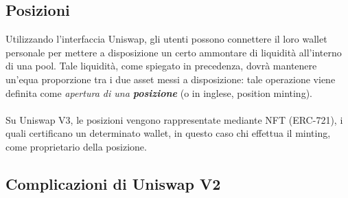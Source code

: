 \documentclass[12pt,a4paper]{report}
\begin{document}
\subsection{Posizioni}

Utilizzando l'interfaccia Uniswap, gli utenti possono connettere il loro wallet personale per mettere a disposizione un certo ammontare di liquidità all'interno di una pool.
Tale liquidità, come spiegato in precedenza, dovrà mantenere un'equa proporzione tra i due asset messi a disposizione: tale operazione viene definita come \textit{apertura di una \textbf{posizione}} (o in inglese, position minting).
\\\\Su Uniswap V3, le posizioni vengono rappresentate mediante NFT (ERC-721\cite{erc_721}), i quali certificano un determinato wallet, in questo caso chi effettua il minting, come proprietario della posizione.

\subsection{Complicazioni di Uniswap V2}
\end{document}
